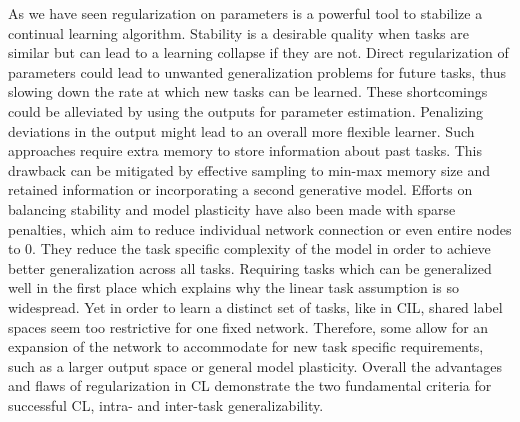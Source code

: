 As we have seen regularization on parameters is a powerful tool to stabilize a continual learning algorithm. Stability is a desirable quality when tasks are similar but can lead to a learning collapse if they are not. Direct regularization of parameters could lead to unwanted generalization problems for future tasks, thus slowing down the rate at which new tasks can be learned. These shortcomings could be alleviated by using the outputs for parameter estimation. Penalizing deviations in the output might lead to an overall more flexible learner. Such approaches require extra memory to store information about past tasks. This drawback can be mitigated by effective sampling to min-max memory size and retained information or incorporating a second generative model. Efforts on balancing stability and model plasticity have also been made with sparse penalties, which aim to reduce individual network connection or even entire nodes to 0. They reduce the task specific complexity of the model in order to achieve better generalization across all tasks. Requiring tasks which can be generalized well in the first place which explains why the linear task assumption is so widespread.
Yet in order to learn a distinct set of tasks, like in CIL, shared label spaces seem too restrictive for one fixed network. Therefore, some allow for an expansion of the network to accommodate for new task specific requirements, such as a larger output space or general model plasticity.
Overall the advantages and flaws of regularization in CL demonstrate the two fundamental criteria \cite{LW} for successful CL, intra- and inter-task generalizability.